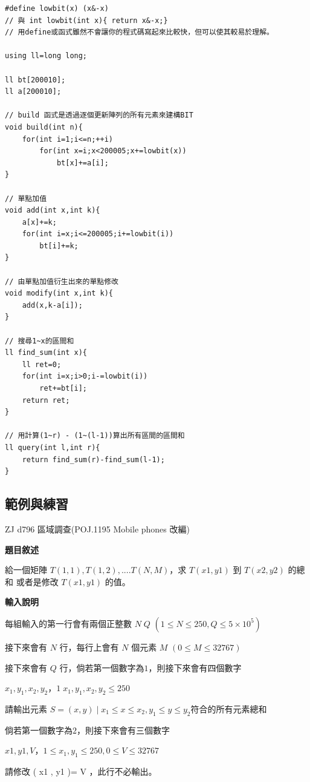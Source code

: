 \begin{lstlisting}[caption=BIT]
#define lowbit(x) (x&-x)
// 與 int lowbit(int x){ return x&-x;}
// 用define或函式雖然不會讓你的程式碼寫起來比較快，但可以使其較易於理解。

using ll=long long;

ll bt[200010];
ll a[200010];

// build 函式是透過逐個更新陣列的所有元素來建構BIT
void build(int n){
    for(int i=1;i<=n;++i)
        for(int x=i;x<200005;x+=lowbit(x))
            bt[x]+=a[i];
}

// 單點加值
void add(int x,int k){
    a[x]+=k;
    for(int i=x;i<=200005;i+=lowbit(i))
        bt[i]+=k;
}

// 由單點加值衍生出來的單點修改
void modify(int x,int k){
    add(x,k-a[i]);
}

// 搜尋1~x的區間和
ll find_sum(int x){
    ll ret=0;
    for(int i=x;i>0;i-=lowbit(i))
        ret+=bt[i];
    return ret;
}

// 用計算(1~r) - (1~(l-1))算出所有區間的區間和
ll query(int l,int r){
    return find_sum(r)-find_sum(l-1);
}
\end{lstlisting}

    \subsection{範例與練習}
    \problem ZJ d796 區域調查(POJ.1195 Mobile phones 改編)

    \textbf{題目敘述}

    給一個矩陣 $T(1,1), T(1,2),.... T(N,M)$，求 $T(x1,y1)$  到 $T(x2,y2)$ 的總和 或者是修改 $T(x1,y1)$ 的值。

    \textbf{輸入說明}

    每組輸入的第一行會有兩個正整數 $N \; Q$ $( 1 \le N \le 250,  Q \le 5 \times 10^5)$

    接下來會有 $N$ 行，每行上會有 $N$ 個元素 $M$ $( 0 \le M \le 32767 )$

    接下來會有 $Q$ 行，倘若第一個數字為$1$，則接下來會有四個數字

    $x_1 , y_1 , x_2 , y_2， 1 \; x_1 , y_1 , x_2 , y_2 \le 250$

    請輸出元素 $S={( x , y ) \; | \; x_1 \le x \le x_2, y_1 \le y \le y_2 }$符合的所有元素總和

    倘若第一個數字為$2$，則接下來會有三個數字

    $x1 , y1 , V， 1 \le x_1 , y_1 \le 250 , 0 \le V \le 32767$

    請修改 ( x1 , y1 )= V ，此行不必輸出。


